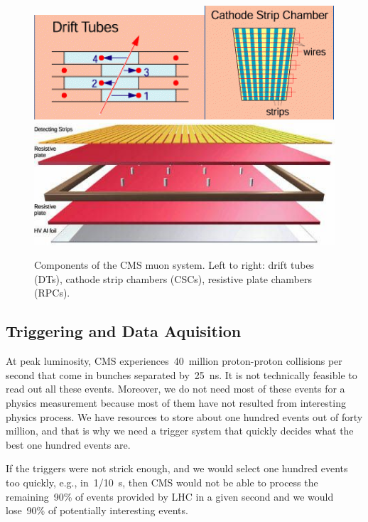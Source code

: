 \begin{figure}[htb]
  \begin{center}
    \includegraphics[height=2.5 cm]{../figs/Exp/muonSystem_driftTubes.png}\quad\includegraphics[height=2.5 cm]{../figs/Exp/muonSystem_CSC.png}\quad\includegraphics[height=2.5 cm]{../figs/Exp/muonSystem_RPC.png}
    \caption{Components of the CMS muon system. Left to right: drift tubes (DTs), cathode strip chambers (CSCs), resistive plate chambers (RPCs).}
    \label{fig:muonSystem}
  \end{center}
\end{figure}


\subsection{Triggering and Data Aquisition}

At peak luminosity, CMS experiences~40~million proton-proton collisions per second that come in bunches separated by~25~ns. It is not technically feasible to read out all these events. Moreover, we do not need most of these events for a physics measurement because most of them have not resulted from interesting physics process. We have resources to store about one hundred events out of forty million, and that is why we need a trigger system that quickly decides what the best one hundred events are.


If the triggers were not strick enough, and we would select one hundred events too quickly, e.g., in~1/10~s, then CMS would not be able to process the remaining~90\% of events provided by LHC in a given second and we would lose~90\% of potentially interesting events.


